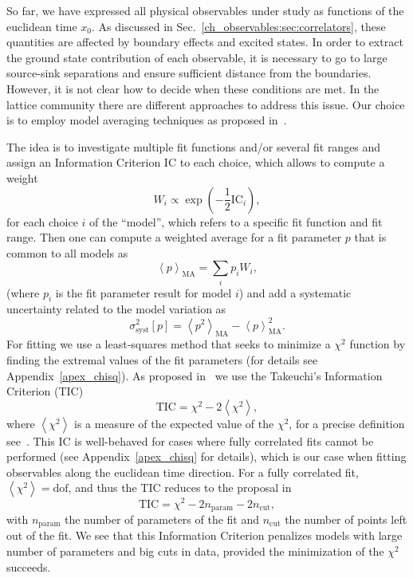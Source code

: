 So far, we have expressed all physical observables under study as functions of the euclidean time $x_0$. As discussed in Sec.~\ref{ch_observables:sec:correlators}, these quantities are affected by boundary effects and excited states. In order to extract the ground state contribution of each observable, it is necessary to go to large source-sink separations and ensure sufficient distance from the boundaries. However, it is not clear how to decide when these conditions are met. In the lattice community there are different approaches to address this issue. Our choice is to employ model averaging techniques as proposed in~\citep{Neil:2022joj,Neil:2023pgt,Frison:2023jbv}.

The idea is to investigate multiple fit functions and/or several fit ranges and assign an Information Criterion ${\textrm{IC}}$ to each choice, which allows to compute a weight
\begin{equation}
\label{ch_observables:eq:weight}
W_i\propto\exp\left(-\frac{1}{2}{\textrm{IC}}_i\right),
\end{equation}
for each choice $i$ of the ``model'', which refers to a specific fit function and fit range. Then one can compute a weighted average for a fit parameter $p$ that is common to all models as
\begin{equation}
\left<{p}\right>_{\textrm{MA}}=\sum_i{p}_iW_i,
\end{equation}
(where $p_i$ is the fit parameter result for model $i$) and add a systematic uncertainty related to the model variation as
\begin{equation}
\label{ch_observables:eq:syst}
\sigma_{\textrm{syst}}^2[p]=\left<{p^2}\right>_{\textrm{MA}}-\left<p\right>^2_{\textrm{MA}}.
\end{equation}
For fitting we use a least-squares method that seeks to minimize a $\chi^2$ function by finding the extremal values of the fit parameters (for details see Appendix~\ref{apex_chisq}). As proposed in~\citep{Frison:2023jbv} we use the Takeuchi's Information Criterion (TIC)
\begin{equation}
\label{ch_observables:eq:TIC}
{\textrm{TIC}}=\chi^2-2\left<\chi^2\right>,
\end{equation}
where $\left<\chi^2\right>$ is a measure of the expected value of the $\chi^2$, for a precise definition see~\citep{Bruno:2022mfy}. This IC is well-behaved for cases where fully correlated fits cannot be performed (see Appendix~\ref{apex_chisq} for details), which is our case when fitting observables along the euclidean time direction. For a fully correlated fit, $\left<\chi^2\right>={\textrm{dof}}$, and thus the TIC reduces to the proposal in~\citep{Neil:2022joj}
\begin{equation}
{\textrm{TIC}}=\chi^2-2n_{\textrm{param}}-2n_{\textrm{cut}},
\end{equation}
with $n_{\textrm{param}}$ the number of parameters of the fit and $n_{\textrm{cut}}$ the number of points left out of the fit. We see that this Information Criterion penalizes models with large number of parameters and big cuts in data, provided the minimization of the $\chi^2$ succeeds.

